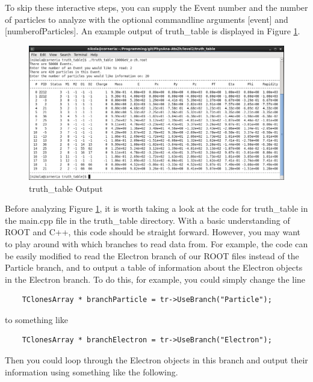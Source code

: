\documentclass{article}
\begin{document}
\bigskip

To skip these interactive steps, you can supply the Event number and the number of
particles to analyze with the optional commandline arguments [event] and [numberofParticles].
An example output of truth\_table is displayed in Figure \ref{fig:truthTableOutput}.

\begin{figure}[!htbp]
	\centering
	\includegraphics[width = \linewidth]{truth_table_screenshot.png}
	\caption{truth\_table Output}
	\label{fig:truthTableOutput}
\end{figure}

\bigskip

Before analyzing Figure \ref{fig:truthTableOutput}, it is worth taking a look at the code for
truth\_table in the main.cpp file in the truth\_table directory. With a basic understanding of
ROOT and C++, this code should be straight forward. However, you may want to play around with
which branches to read data from. For example, the code can be easily modified to read the
Electron branch of our ROOT files instead of the Particle branch, and to output a table of
information about the Electron objects in the Electron branch. To do this, for example, you
could simply change the line

\begin{verbatim}
	TClonesArray * branchParticle = tr->UseBranch("Particle");
\end{verbatim}

to something like

\begin{verbatim}
	TClonesArray * branchElectron = tr->UseBranch("Electron");
\end{verbatim}

Then you could loop through the Electron objects in this branch and output their information
using something like the following.
\end{document}
